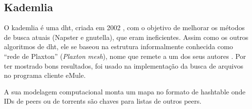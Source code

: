 
\subsection*{Kademlia}

O \gls{kademlia} é uma \gls*{dht}, criada em 2002 \cite{artigo:kademlia}, com o objetivo
de melhorar os métodos de busca atuais (Napster e \gls*{gnutella}), que eram
ineficientes. Assim como os outros algoritmos de \gls*{dht}, ele se baseou na estrutura
informalmente conhecida como \enquote{rede de Plaxton} (\emph{Plaxton mesh}), nome que
remete a um dos seus autores \cite{artigo:dht}. Por ter mostrado bons resultados, foi
usado na implementação da busca de arquivos no programa cliente eMule.

A sua modelagem computacional monta um mapa no formato de \gls*{hashtable} onde IDs de
\glspl*{peer} ou de \glspl*{torrent} são chaves para listas de outros \glspl*{peer}.









